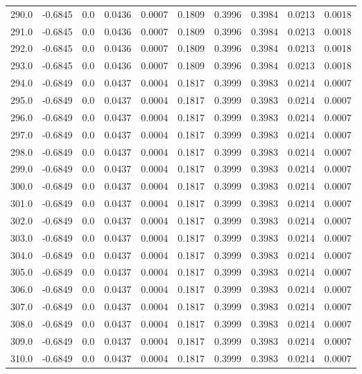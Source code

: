 \begin{longtable}{lrrrrrrrrr}
290.0 & -0.6845 & 0.0 & 0.0436 & 0.0007 & 0.1809 & 0.3996 & 0.3984 & 0.0213 & 0.0018 \\
291.0 & -0.6845 & 0.0 & 0.0436 & 0.0007 & 0.1809 & 0.3996 & 0.3984 & 0.0213 & 0.0018 \\
292.0 & -0.6845 & 0.0 & 0.0436 & 0.0007 & 0.1809 & 0.3996 & 0.3984 & 0.0213 & 0.0018 \\
293.0 & -0.6845 & 0.0 & 0.0436 & 0.0007 & 0.1809 & 0.3996 & 0.3984 & 0.0213 & 0.0018 \\
294.0 & -0.6849 & 0.0 & 0.0437 & 0.0004 & 0.1817 & 0.3999 & 0.3983 & 0.0214 & 0.0007 \\
295.0 & -0.6849 & 0.0 & 0.0437 & 0.0004 & 0.1817 & 0.3999 & 0.3983 & 0.0214 & 0.0007 \\
296.0 & -0.6849 & 0.0 & 0.0437 & 0.0004 & 0.1817 & 0.3999 & 0.3983 & 0.0214 & 0.0007 \\
297.0 & -0.6849 & 0.0 & 0.0437 & 0.0004 & 0.1817 & 0.3999 & 0.3983 & 0.0214 & 0.0007 \\
298.0 & -0.6849 & 0.0 & 0.0437 & 0.0004 & 0.1817 & 0.3999 & 0.3983 & 0.0214 & 0.0007 \\
299.0 & -0.6849 & 0.0 & 0.0437 & 0.0004 & 0.1817 & 0.3999 & 0.3983 & 0.0214 & 0.0007 \\
300.0 & -0.6849 & 0.0 & 0.0437 & 0.0004 & 0.1817 & 0.3999 & 0.3983 & 0.0214 & 0.0007 \\
301.0 & -0.6849 & 0.0 & 0.0437 & 0.0004 & 0.1817 & 0.3999 & 0.3983 & 0.0214 & 0.0007 \\
302.0 & -0.6849 & 0.0 & 0.0437 & 0.0004 & 0.1817 & 0.3999 & 0.3983 & 0.0214 & 0.0007 \\
303.0 & -0.6849 & 0.0 & 0.0437 & 0.0004 & 0.1817 & 0.3999 & 0.3983 & 0.0214 & 0.0007 \\
304.0 & -0.6849 & 0.0 & 0.0437 & 0.0004 & 0.1817 & 0.3999 & 0.3983 & 0.0214 & 0.0007 \\
305.0 & -0.6849 & 0.0 & 0.0437 & 0.0004 & 0.1817 & 0.3999 & 0.3983 & 0.0214 & 0.0007 \\
306.0 & -0.6849 & 0.0 & 0.0437 & 0.0004 & 0.1817 & 0.3999 & 0.3983 & 0.0214 & 0.0007 \\
307.0 & -0.6849 & 0.0 & 0.0437 & 0.0004 & 0.1817 & 0.3999 & 0.3983 & 0.0214 & 0.0007 \\
308.0 & -0.6849 & 0.0 & 0.0437 & 0.0004 & 0.1817 & 0.3999 & 0.3983 & 0.0214 & 0.0007 \\
309.0 & -0.6849 & 0.0 & 0.0437 & 0.0004 & 0.1817 & 0.3999 & 0.3983 & 0.0214 & 0.0007 \\
310.0 & -0.6849 & 0.0 & 0.0437 & 0.0004 & 0.1817 & 0.3999 & 0.3983 & 0.0214 & 0.0007 \\

\end{longtable}
